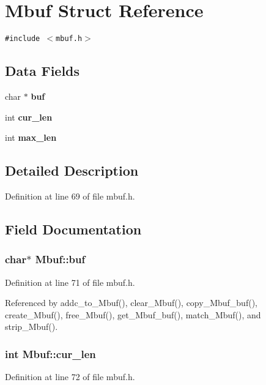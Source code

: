 \section{Mbuf Struct Reference}
\label{structMbuf}
{\tt \#include $<$mbuf.h$>$}

\subsection*{Data Fields}
\begin{CompactItemize}
\item 
char $\ast$ \bf{buf}
\item 
int \bf{cur\_\-len}
\item 
int \bf{max\_\-len}
\end{CompactItemize}


\subsection{Detailed Description}




Definition at line 69 of file mbuf.h.

\subsection{Field Documentation}
\subsubsection{\setlength{\rightskip}{0pt plus 5cm}char$\ast$ \bf{Mbuf::buf}}\label{structMbuf_313a0238256cc6329818f34a33dc329f}




Definition at line 71 of file mbuf.h.

Referenced by addc\_\-to\_\-Mbuf(), clear\_\-Mbuf(), copy\_\-Mbuf\_\-buf(), create\_\-Mbuf(), free\_\-Mbuf(), get\_\-Mbuf\_\-buf(), match\_\-Mbuf(), and strip\_\-Mbuf().
\subsubsection{\setlength{\rightskip}{0pt plus 5cm}int \bf{Mbuf::cur\_\-len}}\label{structMbuf_61a3dc87350c13f3850631dded617df2}




Definition at line 72 of file mbuf.h.

